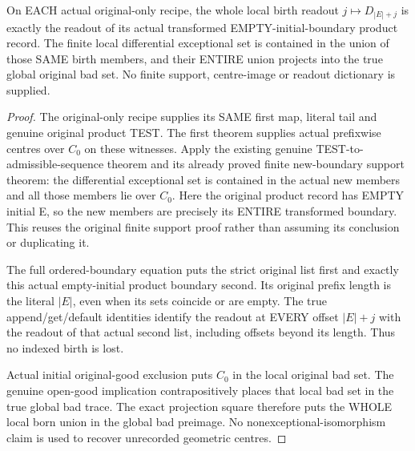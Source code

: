 \begin{theorem}
\label{hir:sharp-actual-original-local-birth-support}
\leanok
On EACH actual original-only recipe, the whole local birth readout
$j\mapsto D_{|E|+j}$ is exactly the readout of its actual transformed
EMPTY-initial-boundary product record. The finite local differential
exceptional set is contained in the union of those SAME birth members,
and their ENTIRE union projects into the true global original bad set.
No finite support, centre-image or readout dictionary is supplied.
\end{theorem}
\begin{proof}
The original-only recipe supplies its SAME first map, literal tail and
genuine original product TEST. The first theorem supplies actual
prefixwise centres over $C_0$ on these witnesses. Apply the existing
genuine TEST-to-admissible-sequence theorem and its already proved
finite new-boundary support theorem: the differential exceptional set
is contained in the actual new members and all those members lie over
$C_0$. Here the original product record has EMPTY initial E, so the
new members are precisely its ENTIRE transformed boundary. This
reuses the original finite support proof rather than assuming its
conclusion or duplicating it.

The full ordered-boundary equation puts the strict original list
first and exactly this actual empty-initial product boundary second.
Its original prefix length is the literal $|E|$, even when its sets
coincide or are empty. The true append/get/default identities identify
the readout at EVERY offset $|E|+j$ with the readout of that actual
second list, including offsets beyond its length. Thus no indexed
birth is lost.

Actual initial original-good exclusion puts $C_0$ in the local original
bad set. The genuine open-good implication contrapositively places
that local bad set in the true global bad trace. The exact projection
square therefore puts the WHOLE local born union in the global bad
preimage. No nonexceptional-isomorphism claim is used to recover
unrecorded geometric centres.
\end{proof}

